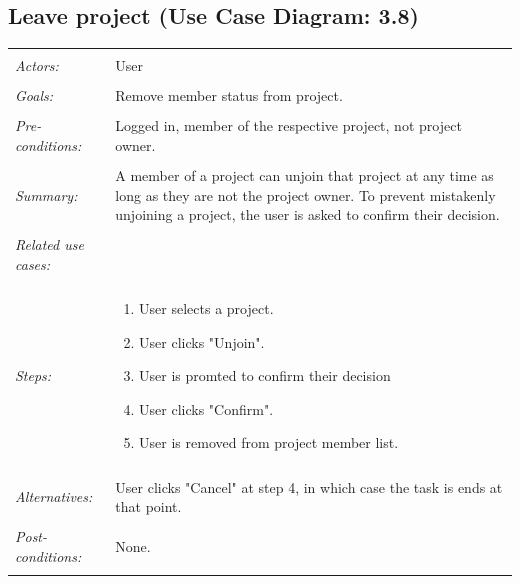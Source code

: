 \documentclass[11pt]{report}
\begin{document}
\subsection{Leave project (Use Case Diagram: 3.8)}
\begin{tabular}{ p{2cm} p{12cm} }
 \hline
 \\
 \textit{Actors:} & User \\ 
 \\
 \textit{Goals:} & Remove member status from project. \\
 \\
 \textit{Pre-conditions:} & Logged in, member of the respective project, not project owner.  \\
\\
 \textit{Summary:} & A member of a project can unjoin that project at any time as long as they are not the project owner. To prevent mistakenly unjoining a project, the user is asked to confirm their decision.\\ 
 \\
 \textit{Related use cases:} & \\ 
 \\
 \textit{Steps:} & \begin{enumerate}
  \item User selects a project.
  \item User clicks "Unjoin". 
  \item User is promted to confirm their decision
  \item User clicks "Confirm".
  \item User is removed from project member list.    
 \end{enumerate} \\
 \\
 \textit{Alternatives:} & User clicks "Cancel" at step 4, in which case the task is ends at that point. \\
 \\
 \textit{Post-conditions:} & None. \\
 \\
\hline
\end{tabular}
\end{document}
